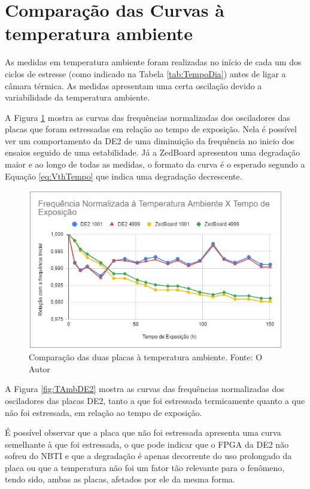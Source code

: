 \section{Comparação das Curvas à temperatura ambiente}
\label{sec:ResTAmb}

As medidas em temperatura ambiente foram realizadas no início de cada um dos ciclos de estresse (como indicado na Tabela \ref{tab:TempoDia}) antes de ligar a câmara térmica. As medidas apresentam uma certa oscilação devido a variabilidade da temperatura ambiente.

A Figura \ref{fig:TAmbEstressadas} mostra as curvas das frequências normalizadas dos osciladores das placas que foram estressadas em relação ao tempo de exposição. Nela é possível ver um comportamento da DE2 de uma diminuição da frequência no inicio dos ensaios seguido de uma estabilidade. Já a ZedBoard apresentou uma degradação maior e ao longo de todas as medidas, o formato da curva é o esperado segundo a Equação \ref{eq:VthTempo} que indica uma degradação decrescente.

\begin{figure}[H]
    \centering
    \includegraphics[scale=0.75]{figures/Resultados/TAmbEstressadas}
    \caption{Comparação das duas placas à temperatura ambiente. Fonte: O Autor}
    \label{fig:TAmbEstressadas}
\end{figure}

A Figura \ref{fig:TAmbDE2} mostra as curvas das frequências normalizadas dos osciladores das placas  DE2, tanto a que foi estressada termicamente quanto a que não foi estressada, em relação ao tempo de exposição.

É possível observar que a placa que não foi estressada apresenta uma curva semelhante à que foi estressada, o que pode indicar que o FPGA da DE2 não sofreu do NBTI e que a degradação é apenas decorrente do uso prolongado da placa ou que a temperatura não foi um fator tão relevante para o fenômeno, tendo sido, ambas as placas, afetados por ele da mesma forma.

